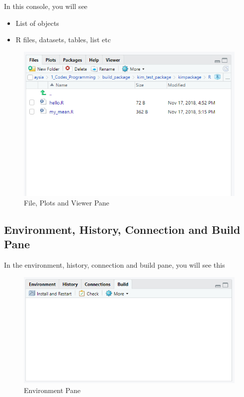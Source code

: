 \documentclass[
]{book}
\providecommand{\tightlist}{%
  \setlength{\itemsep}{0pt}\setlength{\parskip}{0pt}}
\begin{document}
In this console, you will see

\begin{itemize}
\tightlist
\item
  List of objects
\item
  R files, datasets, tables, list etc
\end{itemize}

\begin{figure}
\centering
\includegraphics{files.PNG}
\caption{File, Plots and Viewer Pane}
\end{figure}

\hypertarget{environment-history-connection-and-build-pane}{%
\subsection{Environment, History, Connection and Build Pane}\label{environment-history-connection-and-build-pane}}

In the environment, history, connection and build pane, you will see this

\begin{figure}
\centering
\includegraphics{envir.PNG}
\caption{Environment Pane}
\end{figure}
\end{document}
